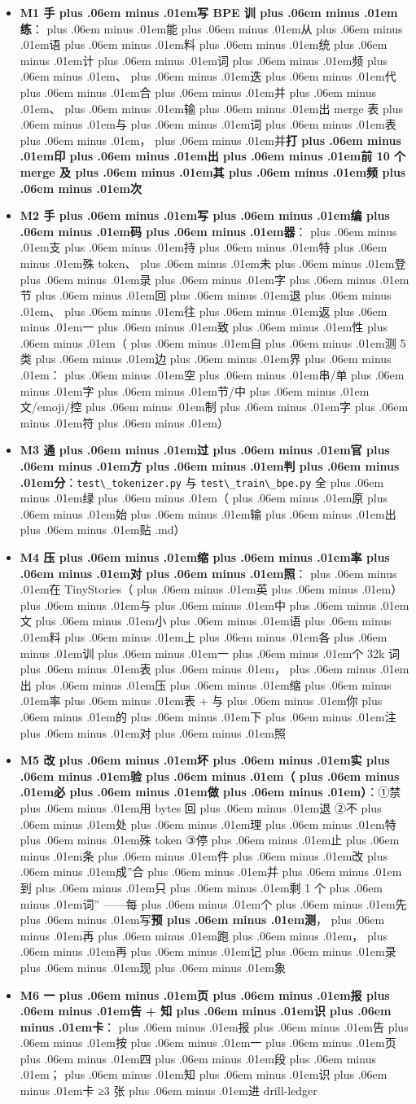 \documentclass[
]{article}
\newcommand{\passthrough}[1]{#1}
\providecommand{\tightlist}{%
  \setlength{\itemsep}{0pt}\setlength{\parskip}{0pt}}
\def\zh#1{{\zhfont #1}}
\def\sym#1{{\symfont #1}}
\def\codezh#1{{\zhmonofont #1}}
\def\zhglue{\hskip0pt plus .06em minus .01em}
\begin{document}
\begin{itemize}
\tightlist
\item[$\square$]
  \textbf{M1 \zh{手\zhglue 写} BPE \zh{训\zhglue 练}}\zh{：\zhglue 能\zhglue 从\zhglue 语\zhglue 料\zhglue 统\zhglue 计\zhglue 词\zhglue 频\zhglue 、\zhglue 迭\zhglue 代\zhglue 合\zhglue 并\zhglue 、\zhglue 输\zhglue 出} merge \zh{表\zhglue 与\zhglue 词\zhglue 表\zhglue ，\zhglue 并}\textbf{\zh{打\zhglue 印\zhglue 出\zhglue 前} 10 \zh{个} merge \zh{及\zhglue 其\zhglue 频\zhglue 次}}
\item[$\square$]
  \textbf{M2 \zh{手\zhglue 写\zhglue 编\zhglue 码\zhglue 器}}\zh{：\zhglue 支\zhglue 持\zhglue 特\zhglue 殊} token\zh{、\zhglue 未\zhglue 登\zhglue 录\zhglue 字\zhglue 节\zhglue 回\zhglue 退\zhglue 、\zhglue 往\zhglue 返\zhglue 一\zhglue 致\zhglue 性\zhglue （\zhglue 自\zhglue 测} 5 \zh{类\zhglue 边\zhglue 界\zhglue ：\zhglue 空\zhglue 串}/\zh{单\zhglue 字\zhglue 节}/\zh{中\zhglue 文}/emoji/\zh{控\zhglue 制\zhglue 字\zhglue 符\zhglue ）}
\item[$\square$]
  \textbf{M3 \zh{通\zhglue 过\zhglue 官\zhglue 方\zhglue 判\zhglue 分}}\zh{：}\passthrough{\lstinline!test\_tokenizer.py!} \zh{与} \passthrough{\lstinline!test\_train\_bpe.py!} \zh{全\zhglue 绿\zhglue （\zhglue 原\zhglue 始\zhglue 输\zhglue 出\zhglue 贴} \passthrough{\codezh{{\zh{判}}{\zh{卷}}{\zh{记}}{\zh{录}}.md}}\zh{）}
\item[$\square$]
  \textbf{M4 \zh{压\zhglue 缩\zhglue 率\zhglue 对\zhglue 照}}\zh{：\zhglue 在} TinyStories\zh{（\zhglue 英\zhglue ）\zhglue 与\zhglue 中\zhglue 文\zhglue 小\zhglue 语\zhglue 料\zhglue 上\zhglue 各\zhglue 训\zhglue 一\zhglue 个} 32k \zh{词\zhglue 表\zhglue ，\zhglue 出\zhglue 压\zhglue 缩\zhglue 率\zhglue 表} + \zh{与\zhglue 你\zhglue 的\zhglue 下\zhglue 注\zhglue 对\zhglue 照}
\item[$\square$]
  \textbf{M5 \zh{改\zhglue 坏\zhglue 实\zhglue 验\zhglue （\zhglue 必\zhglue 做\zhglue ）}}\zh{：}\sym{①}\zh{禁\zhglue 用} bytes \zh{回\zhglue 退} \sym{②}\zh{不\zhglue 处\zhglue 理\zhglue 特\zhglue 殊} token \sym{③}\zh{停\zhglue 止\zhglue 条\zhglue 件\zhglue 改\zhglue 成}''\zh{合\zhglue 并\zhglue 到\zhglue 只\zhglue 剩} 1 \zh{个\zhglue 词}'' ------\zh{每\zhglue 个\zhglue 先\zhglue 写}\textbf{\zh{预\zhglue 测}}\zh{，\zhglue 再\zhglue 跑\zhglue ，\zhglue 再\zhglue 记\zhglue 录\zhglue 现\zhglue 象}
\item[$\square$]
  \textbf{M6 \zh{一\zhglue 页\zhglue 报\zhglue 告} + \zh{知\zhglue 识\zhglue 卡}}\zh{：\zhglue 报\zhglue 告\zhglue 按\zhglue 一\zhglue 页\zhglue 四\zhglue 段\zhglue ；\zhglue 知\zhglue 识\zhglue 卡} \sym{≥}3 \zh{张\zhglue 进} drill-ledger
\end{itemize}
\end{document}
